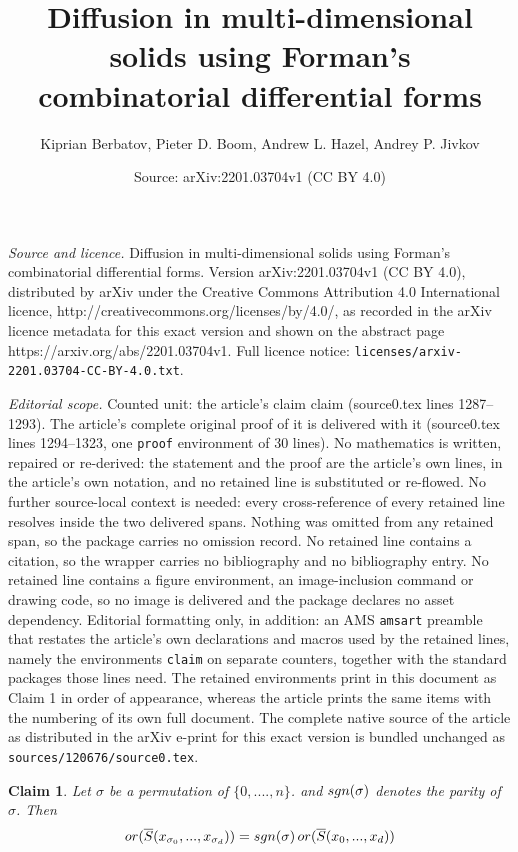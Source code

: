\documentclass[10pt,a4paper]{amsart}
\title{Diffusion in multi-dimensional solids using Forman's combinatorial differential forms}
\author{Kiprian Berbatov, Pieter D. Boom, Andrew L. Hazel, Andrey P. Jivkov}
\date{Source: arXiv:2201.03704v1 (CC BY 4.0)}
\newtheorem{claim}{Claim}
\newcommand{\OR}{\mathop{\rm or}\nolimits}   %
\newcommand{\sgn}{\mathop{\rm sgn}\nolimits}   %
\begin{document}
\maketitle

\noindent\emph{Source and licence.} Diffusion in multi-dimensional solids using Forman's combinatorial differential forms. Version arXiv:2201.03704v1 (CC BY 4.0), distributed by arXiv under the Creative Commons Attribution 4.0 International licence, http://creativecommons.org/licenses/by/4.0/, as recorded in the arXiv licence metadata for this exact version and shown on the abstract page https://arxiv.org/abs/2201.03704v1. Full licence notice: \texttt{licenses/arxiv-2201.03704-CC-BY-4.0.txt}.\par\smallskip

\noindent\textit{Editorial scope.} Counted unit: the article's claim claim (source0.tex lines 1287--1293). The article's complete original proof of it is delivered with it (source0.tex lines 1294--1323, one \texttt{proof} environment of 30 lines). No mathematics is written, repaired or re-derived: the statement and the proof are the article's own lines, in the article's own notation, and no retained line is substituted or re-flowed.  No further source-local context is needed: every cross-reference of every retained line resolves inside the two delivered spans.  Nothing was omitted from any retained span, so the package carries no omission record.  No retained line contains a citation, so the wrapper carries no bibliography and no bibliography entry.  No retained line contains a figure environment, an image-inclusion command or drawing code, so no image is delivered and the package declares no asset dependency.  Editorial formatting only, in addition: an AMS \texttt{amsart} preamble that restates the article's own declarations and macros used by the retained lines, namely the environments \texttt{claim} on separate counters, together with the standard packages those lines need.  The retained environments print in this document as Claim 1 in order of appearance, whereas the article prints the same items with the numbering of its own full document.  The complete native source of the article as distributed in the arXiv e-print for this exact version is bundled unchanged as \texttt{sources/120676/source0.tex}.
\begin{claim}
  Let $\sigma$ be a permutation of $\{0, ...., n\}$. and $\sgn(\sigma)$ denotes the parity of $\sigma$. Then
  \begin{equation}
    \OR(\overline{S}(x_{\sigma_0}, ..., x_{\sigma_d})) =
    \sgn(\sigma) \OR(\overline{S}(x_{0}, ..., x_{d})) 
  \end{equation}
\end{claim}
\end{document}

